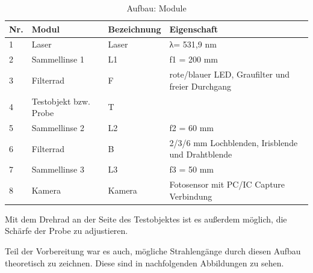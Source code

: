\documentclass[12pt,a4paper,twoside]{article}
\begin{document}
\begin{table}[H]
    \centering
    \caption{Aufbau: Module}
    \label{tab:Aufbau}
    \begin{tabular}{| l | l | l | l |}
        \hline
        Nr.  & Modul & Bezeichnung  & Eigenschaft \\
        \hline
        1 & Laser & Laser & λ= 531,9 nm \\
        2 & Sammellinse 1 & L1 & f1 = 200 mm \\
        3 & Filterrad & F & rote/blauer LED, Graufilter und freier Durchgang \\
        4 & Testobjekt bzw. Probe & T &  \\
        5 & Sammellinse 2 & L2 & f2 = 60 mm \\
        6 & Filterrad & B & 2/3/6 mm Lochblenden, Irisblende und Drahtblende \\
        7 & Sammellinse 3 & L3 & f3 =  50 mm \\
        8 & Kamera & Kamera & Fotosensor mit PC/IC Capture Verbindung \\
        \hline
    \end{tabular}
\end{table}

\noindent
Mit dem Drehrad an der Seite des Testobjektes ist es außerdem möglich, die Schärfe der Probe zu adjustieren. \newline

\noindent
Teil der Vorbereitung war es auch, mögliche Strahlengänge durch diesen Aufbau theoretisch zu zeichnen. Diese sind in nachfolgenden Abbildungen zu sehen.
\end{document}
